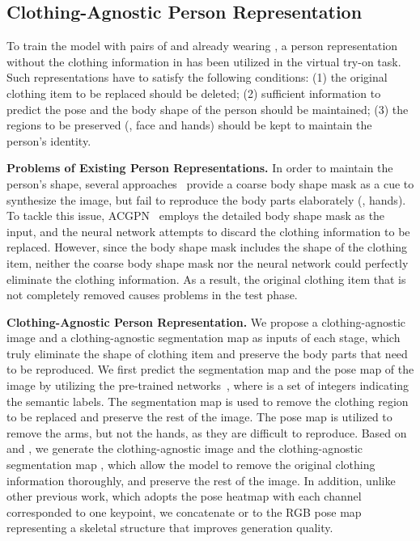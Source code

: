 \subsection{Clothing-Agnostic Person Representation}\label{sec:person representation}
To train the model with pairs of  and  already wearing , a person representation without the clothing information in  has been utilized in the virtual try-on task.
Such representations have to satisfy the following conditions:
(1) the original clothing item to be replaced should be deleted;
(2) sufficient information to predict the pose and the body shape of the person should be maintained;
(3) the regions to be preserved (\eg, face and hands) should be kept to maintain the person's identity.

\textbf{Problems of Existing Person Representations.}
In order to maintain the person's shape, several approaches~\cite{han2018viton, wang2018toward, yu2019vtnfp} provide a coarse body shape mask as a cue to synthesize the image, but fail to reproduce the body parts elaborately (\eg, hands).
To tackle this issue, ACGPN~\cite{yang2020towards} employs the detailed body shape mask as the input, and the neural network attempts to discard the clothing information to be replaced.
However, since the body shape mask includes the shape of the clothing item, neither the coarse body shape mask nor the neural network could perfectly eliminate the clothing information.
As a result, the original clothing item that is not completely removed causes problems in the test phase.

\textbf{Clothing-Agnostic Person Representation.}
We propose a clothing-agnostic image  and a clothing-agnostic segmentation map  as inputs of each stage, which truly eliminate the shape of clothing item and preserve the body parts that need to be reproduced.
We first predict the segmentation map  and the pose map  of the image  by utilizing the pre-trained networks~\cite{gong2018instance, cao2019openpose}, where  is a set of integers indicating the semantic labels.
The segmentation map  is used to remove the clothing region to be replaced and preserve the rest of the image.
The pose map  is utilized to remove the arms, but not the hands, as they are difficult to reproduce.
Based on  and , we generate the clothing-agnostic image  and the clothing-agnostic segmentation map , which allow the model to remove the original clothing information thoroughly, and preserve the rest of the image.
In addition, unlike other previous work, which adopts the pose heatmap with each channel corresponded to one keypoint, we concatenate  or  to the RGB pose map  representing a skeletal structure that improves generation quality.

